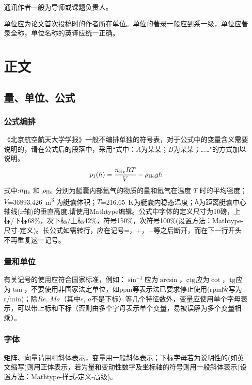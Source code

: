 \documentclass[10.5pt,twocolumn]{aaas}
\begin{document}
通讯作者一般为导师或课题负责人。

单位应为论文首次投稿时的作者所在单位。单位的著录一般应到系一级，单位应著录全称，单位名称的英译应统一正确。

\section{正文}
\subsection{量、单位、公式}
\subsubsection{公式编排}
\label{labSecForm}
《北京航空航天大学学报》一般不编排单独的符号表，对于公式中的变量含义需要说明的，请在公式后的段落中，采用``式中：$A$为某某；$B$为某某；……"的方式加以说明。
\begin{equation}
  \label{eqnLabelp}
  p_1 (h) = \dfrac{n_{\textnormal{He}}RT}{V}-\rho_{\textnormal{He}}gh
\end{equation}
式中:$n_{\textnormal{He}}$ 和 $\rho_{\textnormal{He}}$ 分别为艇囊内部氦气的物质的量和氦气在温度 $T$ 时的平均密度；
$V$=\SI{36893.426}{\cubic\meter}%
为艇囊体积；$T$=\SI{216.65}{\kelvin}为艇囊内稳态温度；$h$为距离艇囊中心轴线($x$轴)的垂直高度.请使用Mathtype编辑。公式中字体的定义尺寸为10磅，上标/下标68\%，次下标/上标42\%，符号150\%，次符号100\%(设置方法：Mathtype-尺寸-定义)。长公式如需转行，应在记号=，+，$-$等之后断开，而在下一行开头不再重复这一记号。

\subsubsection{量和单位}
有关记号的使用应符合国家标准，例如：$\sin^{-1}$应为$\arcsin$，$\rm ctg$应为$\cot$，$\rm tg$应为$\tan$，不要使用非国家法定单位，如ppm等表示法已要求停止使用(rpm应写为r/min)；除$Re$, $Ma$（其中$e$, $a$不是下标）等几个特征数外，变量应使用单个字母表示，可以带上标和下标（否则由多个字母表示单个变量，易被误解为多个变量相乘）。

\subsubsection{字体}
矩阵、向量请用粗斜体表示，变量用一般斜体表示；下标字母若为说明性的(如英文缩写)则用正体表示，若为量和变动性数字及坐标轴的符号则用一般斜体表示(设置方法：Mathtype-样式-定义-高级)。
\end{document}
